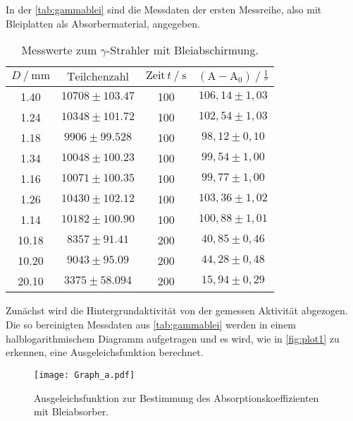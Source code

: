 In der \autoref{tab:gammablei} sind die Messdaten der ersten Messreihe, also mit Bleiplatten als Absorbermaterial, angegeben.
\begin{table}[H]
    \centering
    \caption{Messwerte zum $\gamma$-Strahler mit Bleiabschirmung.}
    \label{tab:gammablei}
    \begin{tabular}{S[table-format=2.2] S[table-format=5.0] S[table-format=3.0] S}
      \toprule
      {$D \mathbin{/} \unit{\milli\meter} $} & {$\text{Teilchenzahl}$} & {$\text{Zeit} \,t \mathbin{/} \unit{\second}$} &{$ \left(\text{A}- \text{A}_0 \right) \mathbin{/} \unit{\frac{1}{\second}}$} \\
         &{$ 10708 \pm  103.47  $}& 100 & {$106,14   \pm 1,03$}  \\
       1.24  & {$10348  \pm  101.72  $}& 100 & {$102,54   \pm 1,03$}  \\
       1.18  & {$ 9906  \pm  99.528  $}& 100 & {$ 98,12   \pm 0,10$}  \\
       1.34  & {$10048  \pm  100.23  $}& 100 & {$ 99,54   \pm 1,00$}  \\
       1.16  & {$10071  \pm  100.35  $}& 100 & {$ 99,77   \pm 1,00$}  \\
       1.26  & {$10430  \pm  102.12  $}& 100 & {$103,36   \pm 1,02$}  \\
       1.14  & {$10182  \pm  100.90  $}& 100 & {$100,88   \pm 1,01$}  \\
      10.18  & {$ 8357  \pm  91.41   $}& 200 & {$ 40,85   \pm 0,46$}  \\
      10.20  & {$ 9043  \pm  95.09   $}& 200 & {$ 44,28   \pm 0,48$}  \\
      20.10  & {$ 3375  \pm  58.094  $}& 200 & {$ 15,94   \pm 0,29$}  \\
      \bottomrule
    \end{tabular}
  \end{table}

Zunächst wird die Hintergrundaktivität von der gemessen Aktivität abgezogen.
Die so bereinigten Messdaten aus \autoref{tab:gammablei} werden in einem halblogarithmischem Diagramm aufgetragen und es wird, wie in \autoref{fig:plot1} zu erkennen, eine Ausgeleichsfunktion berechnet.

\begin{figure}[H]
    \centering
    \texttt{[image: Graph\_a.pdf]}
    \caption{Ausgeleichsfunktion zur Bestimmung des Absorptionskoeffizienten mit Bleiabsorber.}
    \label{fig:plot1}
  \end{figure}

